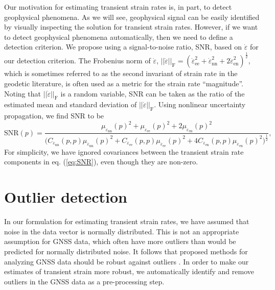 \documentclass[extra,mreferee]{gji}
\begin{document}
Our motivation for estimating transient strain rates is, in part, to detect geophysical phenomena. As we will see, geophysical signal can be easily identified by visually inspecting the solution for transient strain rates. However, if we want to detect geophysical phenomena automatically, then we need to define a detection criterion. We propose using a signal-to-noise ratio, SNR, based on $\dot\varepsilon$ for our detection criterion. The Frobenius norm of $\dot\varepsilon$, $||\dot\varepsilon||_\mathrm{F} = \left(\dot\varepsilon_{\mathrm{ee}}^2 + \dot\varepsilon_{\mathrm{nn}}^2 + 2\dot\varepsilon_{\mathrm{en}}^2\right)^{\frac{1}{2}}$, which is sometimes referred to as the second invariant of strain rate in the geodetic literature, is often used as a metric for the strain rate ``magnitude''. Noting that $||\dot\varepsilon||_\mathrm{F}$ is a random variable, SNR can be taken as the ratio of the estimated mean and standard deviation of $||\dot\varepsilon||_\mathrm{F}$. Using nonlinear uncertainty propagation, we find SNR to be  
\begin{equation}\label{eq:SNR}
\mathrm{SNR}(p) = \frac{\mu_{\dot\varepsilon_\mathrm{nn}}(p)^2 +
                        \mu_{\dot\varepsilon_\mathrm{ee}}(p)^2 +
                        2\mu_{\dot\varepsilon_\mathrm{en}}(p)^2}
                       {\big(C_{\dot\varepsilon_\mathrm{nn}}(p,p)\mu_{\dot\varepsilon_\mathrm{nn}}(p)^2 + 
                              C_{\dot\varepsilon_\mathrm{ee}}(p,p)\mu_{\dot\varepsilon_\mathrm{ee}}(p)^2 + 
                              4C_{\dot\varepsilon_\mathrm{en}}(p,p)\mu_{\dot\varepsilon_\mathrm{en}}(p)^2
                        \big)^{\frac{1}{2}}}
,
\end{equation}
For simplicity, we have ignored covariances between the transient strain rate components in eq. (\ref{eq:SNR}), even though they are non-zero.  

\section{Outlier detection}\label{sec:Outlier}
In our formulation for estimating transient strain rates, we have assumed that noise in the data vector is normally distributed. This is not an appropriate assumption for GNSS data, which often have more outliers than would be predicted for normally distributed noise. It follows that proposed methods for analyzing GNSS data should be robust against outliers \citep[e.g.,][]{Blewitt2016}. In order to make our estimates of transient strain more robust, we automatically identify and remove outliers in the GNSS data as a pre-processing step.
\end{document}
